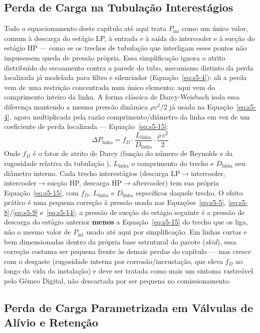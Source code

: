 \documentclass[12pt,a4paper]{article}
\numberwithin{equation}{section}
\numberwithin{table}{section}
\numberwithin{figure}{section}
\begin{document}
	\subsection{\textbf{Perda de Carga na Tubulação Interestágios}}
	Todo o equacionamento deste capítulo até aqui trata $P_{\text{int}}$ como um único valor, comum à descarga do estágio LP, à entrada e à saída do intercooler e à sucção do estágio HP — como se os trechos de tubulação que interligam esses pontos não impusessem queda de pressão própria. Essa simplificação ignora o atrito distribuído do escoamento contra a parede do tubo, mecanismo distinto da perda localizada já modelada para filtro e silenciador (Equação~\eqref{eq:s5-4}): ali a perda vem de uma restrição concentrada num único elemento; aqui vem do comprimento inteiro da linha. A forma clássica de Darcy-Weisbach isola essa diferença mantendo a mesma pressão dinâmica $\rho v^2/2$ já usada na Equação~\eqref{eq:s5-4}, agora multiplicada pela razão comprimento/diâmetro da linha em vez de um coeficiente de perda localizada \cite{white} — Equação~\eqref{eq:s5-15}:
	\begin{equation}\label{eq:s5-15}
 \Delta P_{\text{linha}} = f_D \cdot \frac{L_{\text{linha}}}{D_{\text{linha}}} \cdot \frac{\rho \, v^2}{2}
\end{equation}
	Onde $f_D$ é o fator de atrito de Darcy (função do número de Reynolds e da rugosidade relativa da tubulação \cite{white}), $L_{\text{linha}}$ o comprimento do trecho e $D_{\text{linha}}$ seu diâmetro interno. Cada trecho interestágios (descarga LP$\to$intercooler, intercooler$\to$sucção HP, descarga HP$\to$aftercooler) tem sua própria Equação~\eqref{eq:s5-15}, com $f_D$, $L_{\text{linha}}$ e $D_{\text{linha}}$ específicos daquele trecho. O efeito prático é uma pequena correção à pressão usada nas Equações~\eqref{eq:s5-5}, \eqref{eq:s5-8}/\eqref{eq:s5-9} e~\eqref{eq:s5-14}: a pressão de sucção do estágio seguinte é a pressão de descarga do estágio anterior \textbf{menos} a Equação~\eqref{eq:s5-15} do trecho que os liga, não o mesmo valor de $P_{\text{int}}$ usado até aqui por simplificação. Em linhas curtas e bem dimensionadas dentro da própria base estrutural do pacote (\textit{skid}), essa correção costuma ser pequena frente às demais perdas do capítulo — mas cresce com o desgaste (rugosidade interna por corrosão/incrustação, que eleva $f_D$ ao longo da vida da instalação) e deve ser tratada como mais um sintoma rastreável pelo Gêmeo Digital, não descartada por ser pequena no comissionamento.

	\subsection{\textbf{Perda de Carga Parametrizada em Válvulas de Alívio e Retenção}}
\end{document}
